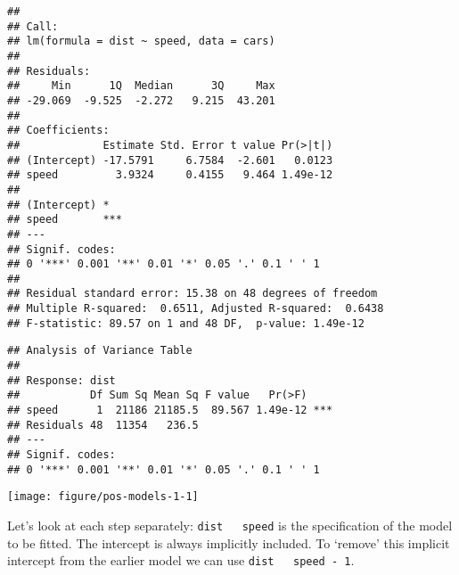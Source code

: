 \documentclass[paper=a4,10pt,div=17,headsepline,BCOR=12mm,twoside,open=right]{scrbook}\usepackage{knitr}
\begin{document}
\begin{knitrout}\footnotesize
{}\color{fgcolor}\begin{kframe}
\begin{alltt}
 \hlkwb{<-}  \hlopt{~}   
  \hlstd{=} \hlstd{)} 
 
\end{alltt}
\begin{verbatim}
## 
## Call:
## lm(formula = dist ~ speed, data = cars)
## 
## Residuals:
##     Min      1Q  Median      3Q     Max 
## -29.069  -9.525  -2.272   9.215  43.201 
## 
## Coefficients:
##             Estimate Std. Error t value Pr(>|t|)
## (Intercept) -17.5791     6.7584  -2.601   0.0123
## speed         3.9324     0.4155   9.464 1.49e-12
##                
## (Intercept) *  
## speed       ***
## ---
## Signif. codes:  
## 0 '***' 0.001 '**' 0.01 '*' 0.05 '.' 0.1 ' ' 1
## 
## Residual standard error: 15.38 on 48 degrees of freedom
## Multiple R-squared:  0.6511,	Adjusted R-squared:  0.6438 
## F-statistic: 89.57 on 1 and 48 DF,  p-value: 1.49e-12
\end{verbatim}
\begin{alltt}
 
\end{alltt}
\begin{verbatim}
## Analysis of Variance Table
## 
## Response: dist
##           Df Sum Sq Mean Sq F value   Pr(>F)    
## speed      1  21186 21185.5  89.567 1.49e-12 ***
## Residuals 48  11354   236.5                     
## ---
## Signif. codes:  
## 0 '***' 0.001 '**' 0.01 '*' 0.05 '.' 0.1 ' ' 1
\end{verbatim}
\end{kframe}

{\centering \texttt{[image: figure/pos-models-1-1]} 

}



\end{knitrout}

Let's look at each step separately: \texttt{dist ~ speed} is the specification of the model to be fitted. The intercept is always implicitly included. To `remove' this implicit intercept from the earlier model we can use \texttt{dist ~ speed - 1}.
\end{document}
